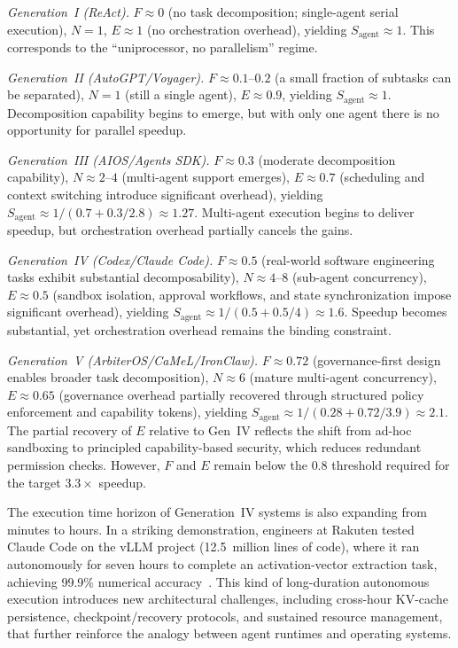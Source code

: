

\textit{Generation~I (ReAct).}
$F \approx 0$ (no task decomposition; single-agent serial execution), $N=1$, $E \approx 1$ (no orchestration overhead), yielding $S_{\mathrm{agent}} \approx 1$.
This corresponds to the ``uniprocessor, no parallelism'' regime.

\textit{Generation~II (AutoGPT/Voyager).}
$F \approx 0.1$--$0.2$ (a small fraction of subtasks can be separated), $N=1$ (still a single agent), $E \approx 0.9$, yielding $S_{\mathrm{agent}} \approx 1$.
Decomposition capability begins to emerge, but with only one agent there is no opportunity for parallel speedup.

\textit{Generation~III (AIOS/Agents SDK).}
$F \approx 0.3$ (moderate decomposition capability), $N \approx 2$--$4$ (multi-agent support emerges), $E \approx 0.7$ (scheduling and context switching introduce significant overhead), yielding $S_{\mathrm{agent}} \approx 1/(0.7 + 0.3/2.8) \approx 1.27$.
Multi-agent execution begins to deliver speedup, but orchestration overhead partially cancels the gains.

\textit{Generation~IV (Codex/Claude Code).}
$F \approx 0.5$ (real-world software engineering tasks exhibit substantial decomposability), $N \approx 4$--$8$ (sub-agent concurrency), $E \approx 0.5$ (sandbox isolation, approval workflows, and state synchronization impose significant overhead), yielding $S_{\mathrm{agent}} \approx 1/(0.5 + 0.5/4) \approx 1.6$.
Speedup becomes substantial, yet orchestration overhead remains the binding constraint.

\textit{Generation~V (ArbiterOS/CaMeL/IronClaw).}
$F \approx 0.72$ (governance-first design enables broader task decomposition), $N \approx 6$ (mature multi-agent concurrency), $E \approx 0.65$ (governance overhead partially recovered through structured policy enforcement and capability tokens), yielding $S_{\mathrm{agent}} \approx 1/(0.28 + 0.72/3.9) \approx 2.1$.
The partial recovery of $E$ relative to Gen~IV reflects the shift from ad-hoc sandboxing to principled capability-based security, which reduces redundant permission checks. However, $F$ and $E$ remain below the $0.8$ threshold required for the target $3.3\times$ speedup.

The execution time horizon of Generation~IV systems is also expanding from minutes to hours.
In a striking demonstration, engineers at Rakuten tested Claude Code on the vLLM project (12.5~million lines of code), where it ran autonomously for seven hours to complete an activation-vector extraction task, achieving 99.9\% numerical accuracy~\cite{anthropic2026agenticreport}.
This kind of long-duration autonomous execution introduces new architectural challenges, including cross-hour KV-cache persistence, checkpoint/recovery protocols, and sustained resource management, that further reinforce the analogy between agent runtimes and operating systems.

